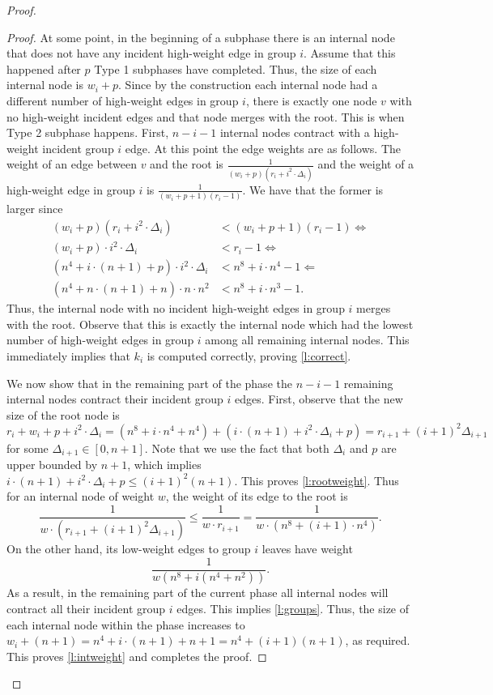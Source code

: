 \documentclass[11pt]{article}
\begin{document}
\begin{proof}
\begin{proof}
At some point, in the beginning of a subphase there is an internal node that does not have any incident high-weight edge in group $i$.
Assume that this happened after $p$ Type 1 subphases have completed.
Thus, the size of each internal node is $w_i + p$.
Since by the construction each internal node had a different number of high-weight edges in group $i$, there is exactly one node $v$ with no high-weight incident edges and that node merges with the root.
This is when Type 2 subphase happens.
First, $n-i-1$ internal nodes contract with a high-weight incident group $i$ edge.
At this point the edge weights are as follows.
The weight of an edge between $v$ and the root is $\frac{1}{(w_i+p)(r_i + i^2\cdot \Delta_i)}$ and the weight of a high-weight edge in group $i$ is
$\frac{1}{(w_i+p+1)(r_i-1)}$. We have that the former is larger since
\begin{align*}
(w_i+p)(r_i + i^2\cdot \Delta_i) & < (w_i+p+1)(r_i-1) \iff\\
(w_i+p)\cdot i^2\cdot \Delta_i & < r_i-1 \iff\\
(n^4 + i \cdot (n+1) + p) \cdot i^2 \cdot \Delta_i & < n^8 + i \cdot n^4 - 1 \Leftarrow \\
(n^4 + n \cdot (n+1) + n) \cdot n \cdot n^2 & < n^8 + i \cdot n^3 - 1.
\end{align*}
Thus, the internal node with no incident high-weight edges in group $i$ merges with the root.
Observe that this is exactly the internal node which had the lowest number of high-weight edges in group $i$ among all remaining internal nodes.
This immediately implies that $k_i$ is computed correctly, proving \cref{l:correct}.

We now show that in the remaining part of the phase the $n-i-1$ remaining internal nodes contract their incident group $i$ edges.
First, observe that the new size of the root node is
\[
r_i + w_i + p + i^2 \cdot \Delta_i = \left(n^8 + i \cdot n^4 + n^4\right) + \left(i \cdot (n+1) + i^2 \cdot \Delta_i + p\right) = r_{i+1} + (i+1)^2 \Delta_{i+1}
\]
for some $\Delta_{i+1} \in [0, n+1]$.
Note that we use the fact that both $\Delta_i$ and $p$ are upper bounded by $n+1$, which implies $i \cdot (n+1) + i^2 \cdot \Delta_i + p \leq (i+1)^2(n+1)$.
This proves \cref{l:rootweight}.
Thus for an internal node of weight $w$, the weight of its edge to the root is  
\[
\frac{1}{w \cdot (r_{i+1} + (i+1)^2 \Delta_{i+1})} \leq \frac{1}{w \cdot r_{i+1}} = \frac{1}{w \cdot (n^8 + (i+1) \cdot n^4)}.\]
On the other hand, its low-weight edges to group $i$ leaves have weight
\[
\frac{1}{w(n^8 + i(n^4 + n^2))}.
\]
As a result, in the remaining part of the current phase all internal nodes will contract all their incident group $i$ edges. This implies \cref{l:groups}.
Thus, the size of each internal node within the phase  increases to $w_i + (n+1) = n^4 + i \cdot (n+1) + n + 1 = n^4 + (i+1)(n+1)$, as required.
This proves \cref{l:intweight} and completes the proof.
\end{proof}



\end{proof}
\end{document}

